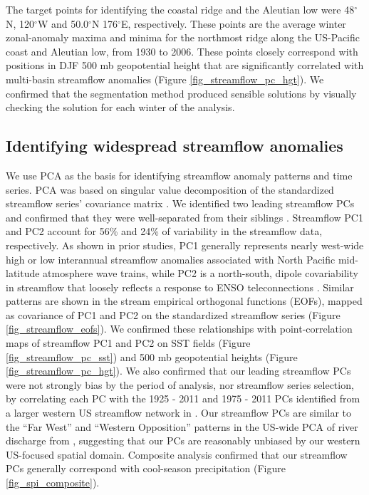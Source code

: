 \documentclass[final, double]{ua-thesis}
\begin{document}
The target points for identifying the coastal ridge and the Aleutian low were 48$^{\circ}$N, 120$^{\circ}$W and 50.0$^{\circ}$N 176$^{\circ}$E, respectively. These points are the average winter zonal-anomaly maxima and minima for the northmost ridge along the US-Pacific coast and Aleutian low, from 1930 to 2006. These points closely correspond with positions in DJF 500 mb geopotential height that are significantly correlated with multi-basin streamflow anomalies (Figure \ref{fig_streamflow_pc_hgt}). We confirmed that the segmentation method produced sensible solutions by visually checking the solution for each winter of the analysis.


\subsection{Identifying widespread streamflow anomalies}

We use PCA as the basis for identifying streamflow anomaly patterns and time series. PCA was based on singular value decomposition of the standardized streamflow series' covariance matrix \citep{2wilks_statistical_2006, 2dawson_eofs:_2016}. We identified two leading streamflow PCs and confirmed that they were well-separated from their siblings \citep{2north_sampling_1982}. Streamflow PC1 and PC2 account for 56\% and 24\% of variability in the streamflow data, respectively. As shown in prior studies, PC1 generally represents nearly west-wide high or low interannual streamflow anomalies associated with North Pacific mid-latitude atmosphere wave trains, while PC2 is a north-south, dipole covariability in streamflow that loosely reflects a response to ENSO teleconnections \citep{2malevich_pacific_2016}. Similar patterns are shown in the stream empirical orthogonal functions (EOFs), mapped as covariance of PC1 and PC2 on the standardized streamflow series (Figure \ref{fig_streamflow_eofs}). We confirmed these relationships with point-correlation maps of streamflow PC1 and PC2 on SST fields (Figure \ref{fig_streamflow_pc_sst}) and 500 mb geopotential heights (Figure \ref{fig_streamflow_pc_hgt}). We also confirmed that our leading streamflow PCs were not strongly bias by the period of analysis, nor streamflow series selection, by correlating each PC with the 1925 - 2011 and 1975 - 2011 PCs identified from a larger western US streamflow network in \citet{2malevich_pacific_2016}. Our streamflow PCs are similar to the ``Far West'' and ``Western Opposition'' patterns in the US-wide PCA of river discharge from \citet{2lins_regional_1997}, suggesting that our PCs are reasonably unbiased by our western US-focused spatial domain. Composite analysis confirmed that our streamflow PCs generally correspond with cool-season precipitation (Figure \ref{fig_spi_composite}).
\end{document}
